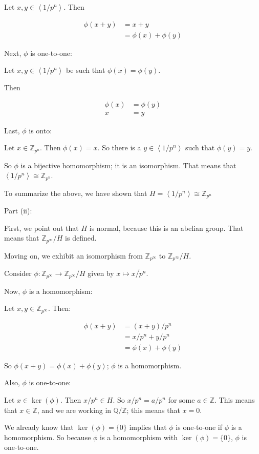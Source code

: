 \documentclass[a4paper,12pt]{article}
\newcommand{\tab}{\hspace{4mm}} %
\newcommand{\shunt}{\vspace{20mm}}
\newcommand{\anbrack}[1]{\left\langle #1 \right\rangle}
\newcommand{\Q}{\mathbb{Q}}
\newcommand{\Z}{\mathbb{Z}}
\begin{document}
\tab Let $x,y \in \anbrack{1/p^n}$. Then

\begin{align*}
\phi(x+y) &= x+y\\
&=\phi(x)+\phi(y)
\end{align*}

Next, $\phi$ is one-to-one:

\tab Let $x,y \in \anbrack{1/p^n}$ be such that $\phi(x)=\phi(y)$.

\tab Then

\begin{align*}
\phi(x) &=\phi(y)\\
x&=y
\end{align*}

Last, $\phi$ is onto:

\tab Let $x \in \Z_{p^n}$. Then $\phi(x) = x$. So there is a $y \in \anbrack{1/p^n}$ such that $\phi(y) = y$.

So $\phi$ is a bijective homomorphism; it is an isomorphism. That means that $\anbrack{1/p^n} \cong \Z_{p^n}$.

To summarize the above, we have shown that $H = \anbrack{1/p^n} \cong \Z_{p^n}$

\shunt

Part (ii):

First, we point out that $H$ is normal, because this is an abelian group. That means that $\Z_{p^\infty}/H$ is defined.

Moving on, we exhibit an isomorphism from $\Z_{p^\infty}$ to $\Z_{p^\infty}/H$.

Consider $\phi: \Z_{p^\infty} \to \Z_{p^\infty}/H $ given by $x \mapsto \overline{x/p^n}$.

Now, $\phi$ is a homomorphism:

\tab Let $x,y \in \Z_{p^\infty}$. Then:

\begin{align*}
\phi(x+y) &= (x+y)/p^n\\
&= x/p^n + y/p^n\\
&= \phi(x)+\phi(y)
\end{align*}

\tab So $\phi(x+y) = \phi(x) + \phi(y)$; $\phi$ is a homomorphism.

Also, $\phi$ is one-to-one:

\tab Let $x \in \ker(\phi)$. Then $x/p^n \in H$. So $x/p^n = a/p^n$ for some $a \in \Z$. This means that $x \in \Z$, and we are working in $\Q/\Z$; this means that $x = 0$.

\tab We already know that $\ker(\phi)=\{0\}$ implies that $\phi$ is one-to-one if $\phi$ is a homomorphism. So because $\phi$ is a homomorphism with $\ker (\phi)=\{0\}$, $\phi$ is one-to-one.
\end{document}
